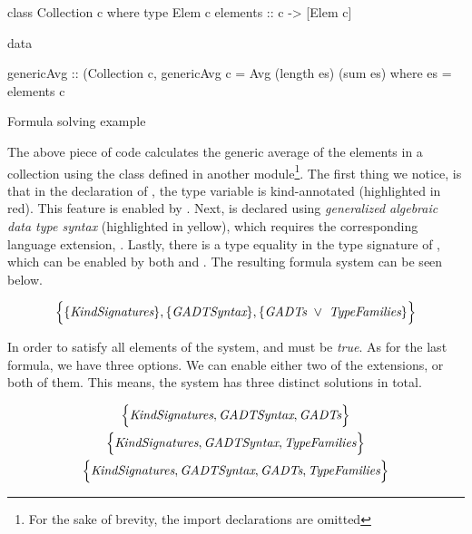 \documentclass[main.tex]{subfiles}
\begin{document}
	\begin{codeFloat}[H]
		\begin{haskell}
			class Collection c where
			  type Elem c
			  elements :: c -> [Elem c]
		\end{haskell}
		\begin{haskell}
			data %
			
			genericAvg :: (Collection c,  %
			genericAvg c = Avg (length es) (sum es)
			  where es = elements c
		\end{haskell}
		\caption{Formula solving example}
		\label{code:sat-solving}
	\end{codeFloat}
	
	The above piece of code calculates the generic average of the elements in a collection using the  class defined in another module\footnote{For the sake of brevity, the import declarations are omitted}. The first thing we notice, is that in the declaration of , the type variable  is kind-annotated (highlighted in red). This feature is enabled by . Next,  is declared using \emph{generalized algebraic data type syntax} (highlighted in yellow), which requires the corresponding language extension, . Lastly, there is a type equality in the type signature of , which can be enabled by both  and . The resulting formula system can be seen below.
	
	\begin{align*}
		\Big\{ \{\textit{KindSignatures}\}, \{\textit{GADTSyntax}\}, \{\textit{GADTs}~\lor~\textit{TypeFamilies}\} \Big\}
	\end{align*}
	
	In order to satisfy all elements of the system,  and  must be \emph{true}. As for the last formula, we have three options. We can enable either two of the extensions, or both of them. This means, the system has three distinct solutions in total.
	
	\begin{gather}
		\Big\{ \textit{KindSignatures}, \textit{GADTSyntax}, \textit{GADTs} \Big\} \label{eq:set-GADTs} \\
		\Big\{ \textit{KindSignatures}, \textit{GADTSyntax}, \textit{TypeFamilies} \Big\} \label{eq:set-TypeFamilies} \\
		\Big\{ \textit{KindSignatures}, \textit{GADTSyntax}, \textit{GADTs}, \textit{TypeFamilies} \Big\} \label{eq:set-both}
	\end{gather}
	
\end{document}
